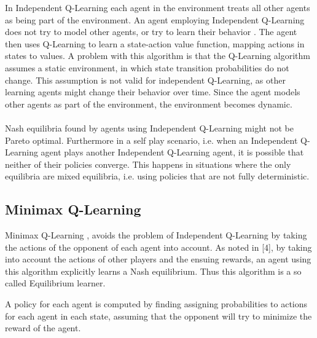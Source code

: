 \documentclass[a4paper,12pt]{article}
\begin{document}
In Independent Q-Learning each agent in the environment treats all other agents as being part of the environment. An agent employing Independent Q-Learning does not try to model other agents, or try to learn their behavior \cite{vlasis}. The agent then uses Q-Learning to learn a state-action value function, mapping actions in states to values.
A problem with this algorithm is that the Q-Learning algorithm \cite{SB} assumes a static environment, in which state transition probabilities do not change. This assumption is not valid for independent Q-Learning, as other learning agents might change their behavior over time. Since the agent models other agents as part of the environment, the environment becomes dynamic.
\\ \\
Nash equilibria found by agents using Independent Q-Learning might not be Pareto optimal. Furthermore in a self play scenario, i.e. when an Independent Q-Learning agent plays another Independent Q-Learning agent, it is possible that neither of their policies converge. This happens in situations where the only equilibria are mixed equilibria, i.e. using policies that are not fully deterministic.

\subsection{Minimax Q-Learning}

Minimax Q-Learning \cite{minimax}, avoids the problem of Independent Q-Learning by taking the actions of the opponent of each agent into account. As noted in [4], by taking into account the actions of other players and the ensuing rewards, an agent using this algorithm explicitly learns a Nash equilibrium. Thus this algorithm is a so called Equilibrium learner.

A policy for each agent is computed by finding assigning probabilities to actions for each agent in each state, assuming that the opponent will try to minimize the reward of the agent. 
\end{document}
